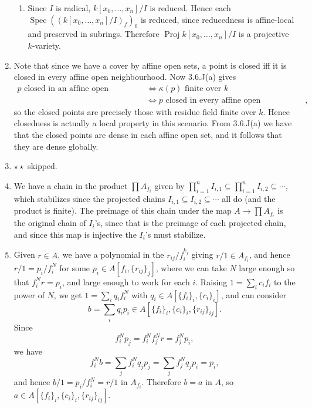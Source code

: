 \documentclass{report}
\DeclareMathOperator{\Spec}{Spec}
\DeclareMathOperator{\Proj}{Proj}
\begin{document}
\begin{enumerate}[label=\textbf{5.3.\Alph*.}]
\begin{enumerate}[label=(\alph*)]
		      \item Since $I$ is radical, $k[x_0,\ldots,x_n]/I$ is reduced. Hence
		            each $\Spec((k[x_0,\ldots,x_n]/I)_f)_0$ is reduced, since
		            reducedness is affine-local and preserved in subrings. Therefore
		            $\Proj k[x_0,\ldots,x_n]/I$ is a projective $k$-variety.
	      \end{enumerate}

	\item Note that since we have a cover by affine open sets, a point is closed
	      iff it is closed in every affine open neighbourhood. Now 3.6.J(a) gives
	      \begin{align*}
		      \text{$p$ closed in an affine open neighbourhood}
		       & \iff \text{$\kappa(p)$ finite over $k$}                    \\
		       & \iff \text{$p$ closed in every affine open neighbourhood},
	      \end{align*}
	      so the closed points are precisely those with residue field finite over
	      $k$. Hence closedness is actually a local property in this scenario.
	      From 3.6.J(a) we have that the closed points are dense in each affine
	      open set, and it follows that they are dense globally.

	\item $\star\star$ skipped.

	\item We have a chain in the product $\prod A_{f_i}$ given by
	      $\prod_{i=1}^nI_{i,1}\subseteq\prod_{i=1}^nI_{i,2}\subseteq\cdots$,
	      which stabilizes since the projected chains
	      $I_{i,1}\subseteq I_{i,2}\subseteq\cdots$ all do (and the product is
	      finite). The preimage of this chain under the map $A\to\prod A_{f_i}$ is
	      the original chain of $I_i$'s, since that is the preimage of each
	      projected chain, and since this map is injective the $I_i$'s must
	      stabilize.

	\item Given $r\in A$, we have a polynomial in the $r_{ij}/f_i^{k_j}$ giving
	      $r/1\in A_{f_i}$, and hence $r/1=p_i/f_i^N$ for some
	      $p_i\in A[f_i,\{r_{ij}\}_j]$, where we can take $N$ large enough so that
	      $f_i^Nr=p_i$, and large enough to work for each $i$. Raising
	      $1=\sum_ic_if_i$ to the power of $N$, we get $1=\sum_iq_if_i^N$ with
	      $q_i\in A[\{f_i\}_i,\{c_i\}_i]$, and can consider
	      \begin{equation*}
		      b=\sum_iq_ip_i\in A[\{f_i\}_i,\{c_i\}_i,\{r_{ij}\}_{ij}].
	      \end{equation*}
	      Since
	      \begin{equation*}
		      f_i^Np_j = f_i^Nf_j^Nr = f_j^Np_i,
	      \end{equation*}
	      we have
	      \begin{equation*}
		      f_i^Nb = \sum_jf_i^Nq_jp_j = \sum_jf_j^Nq_jp_i = p_i,
	      \end{equation*}
	      and hence $b/1=p_i/f_i^N=r/1$ in $A_{f_i}$. Therefore $b=a$ in $A$, so
	      $a\in A[\{f_i\}_i,\{c_i\}_i,\{r_{ij}\}_{ij}]$.
\end{enumerate}
\end{document}
